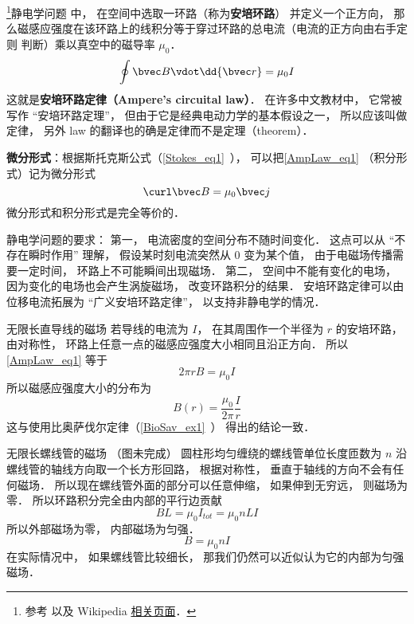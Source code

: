 

\footnote{参考 \cite{GriffE} 以及 Wikipedia \href{https://en.wikipedia.org/wiki/Ampère's_circuital_law}{相关页面}．}静电学问题%
中， 在空间中选取一环路（称为\textbf{安培环路}） 并定义一个正方向， 那么磁感应强度在该环路上的线积分等于穿过环路的总电流（电流的正方向由右手定则 判断）乘以真空中的磁导率 $\mu_0$．
\begin{equation}\label{AmpLaw_eq1}
\oint \bvec B \vdot \dd{\bvec r} = \mu_0 I
\end{equation}
这就是\textbf{安培环路定律（Ampere's circuital law）}． 在许多中文教材中， 它常被写作 “安培环路定理”， 但由于它是经典电动力学的基本假设之一， 所以应该叫做定律， 另外 law 的翻译也的确是定律而不是定理（theorem）．

\textbf{微分形式}：根据斯托克斯公式（\autoref{Stokes_eq1}~）， 可以把\autoref{AmpLaw_eq1} （积分形式）记为微分形式
\begin{equation}\label{AmpLaw_eq2}
\curl \bvec B = \mu_0 \bvec j
\end{equation}
微分形式和积分形式是完全等价的．

静电学问题的要求： 第一， 电流密度的空间分布不随时间变化． 这点可以从 “不存在瞬时作用” 理解， 假设某时刻电流突然从 0 变为某个值， 由于电磁场传播需要一定时间， 环路上不可能瞬间出现磁场． 第二， 空间中不能有变化的电场， 因为变化的电场也会产生涡旋磁场， 改变环路积分的结果． 安培环路定律可以由位移电流拓展为 “广义安培环路定律”， 以支持非静电学的情况．

\begin{example}{无限长直导线的磁场}\label{AmpLaw_ex1}
若导线的电流为 $I$， 在其周围作一个半径为 $r$ 的安培环路， 由对称性， 环路上任意一点的磁感应强度大小相同且沿正方向． 所以\autoref{AmpLaw_eq1} 等于
\begin{equation}
2\pi r B = \mu_0 I
\end{equation}
所以磁感应强度大小的分布为
\begin{equation}
B(r) = \frac{\mu_0}{2\pi} \frac Ir
\end{equation}
这与使用比奥萨伐尔定律（\autoref{BioSav_ex1}~） 得出的结论一致．
\end{example}

\begin{example}{无限长螺线管的磁场}\label{AmpLaw_ex2}
（图未完成） 
圆柱形均匀缠绕的螺线管单位长度匝数为 $n$ 沿螺线管的轴线方向取一个长方形回路， 根据对称性， 垂直于轴线的方向不会有任何磁场． 所以现在螺线管外面的部分可以任意伸缩， 如果伸到无穷远， 则磁场为零． 所以环路积分完全由内部的平行边贡献
\begin{equation}
BL = \mu_0 I_{tot} = \mu_0 nLI
\end{equation}
所以外部磁场为零， 内部磁场为匀强．
\begin{equation}
B = \mu_0 nI
\end{equation}
在实际情况中， 如果螺线管比较细长， 那我们仍然可以近似认为它的内部为匀强磁场．
\end{example}

